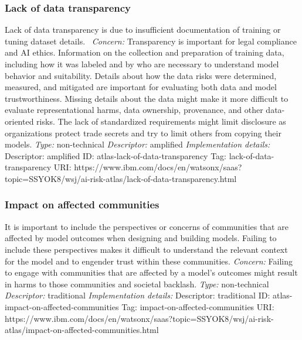 \documentclass{article}
\begin{document}
\subsubsection*{Lack of data transparency}
Lack of data transparency is due to insufficient documentation of training or tuning dataset details. \newline
\textit{Concern: }Transparency is important for legal compliance and AI ethics. Information on the collection and preparation of training data, including how it was labeled and by who are necessary to understand model behavior and suitability. Details about how the data risks were determined, measured, and mitigated are important for evaluating both data and model trustworthiness. Missing details about the data might make it more difficult to evaluate representational harms, data ownership, provenance, and other data-oriented risks. The lack of standardized requirements might limit disclosure as organizations protect trade secrets and try to limit others from copying their models.\newline\newline
\textit{Type: }non-technical\newline
\textit{Descriptor: }amplified \newline\newline
\textit{Implementation details:} \newline
Descriptor: amplified \newline
ID: atlas-lack-of-data-transparency \newline
Tag: lack-of-data-transparency \newline
URI:  https://www.ibm.com/docs/en/watsonx/saas?topic=SSYOK8/wsj/ai-risk-atlas/lack-of-data-transparency.html\newline
\subsubsection*{Impact on affected communities}
It is important to include the perspectives or concerns of communities that are affected by model outcomes when designing and building models. Failing to include these perspectives makes it difficult to understand the relevant context for the model and to engender trust within these communities.\newline
\textit{Concern: }Failing to engage with communities that are affected by a model's outcomes might result in harms to those communities and societal backlash.\newline\newline
\textit{Type: }non-technical\newline
\textit{Descriptor: }traditional \newline\newline
\textit{Implementation details:} \newline
Descriptor: traditional \newline
ID: atlas-impact-on-affected-communities \newline
Tag: impact-on-affected-communities \newline
URI:  https://www.ibm.com/docs/en/watsonx/saas?topic=SSYOK8/wsj/ai-risk-atlas/impact-on-affected-communities.html\newline
\end{document}
